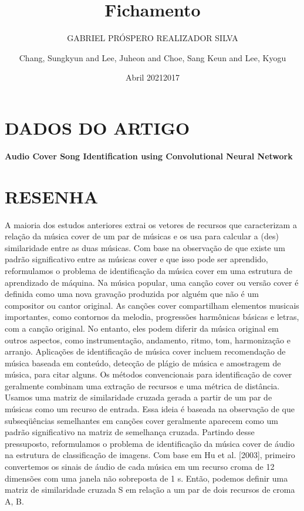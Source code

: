 \documentclass{article}
\title{Fichamento}
\author{GABRIEL PRÓSPERO REALIZADOR  SILVA}
\date{Abril 2021}
\begin{document}
\maketitle

\section{DADOS DO ARTIGO}
\textbf{ Audio Cover Song Identification using Convolutional Neural Network  \\}
\author{Chang, Sungkyun and Lee, Juheon and Choe, Sang Keun and Lee, Kyogu \\}
\date{2017}

\section{RESENHA}
A maioria dos estudos anteriores extrai os vetores de recursos que caracterizam a relação da música cover de um par de músicas e os usa para calcular a (des) similaridade entre as duas músicas. 
Com base na observação de que existe um padrão significativo entre as músicas cover e que isso pode ser aprendido, reformulamos o problema de identificação da música cover em uma estrutura de aprendizado de máquina.
Na música popular, uma canção cover ou versão cover é definida como uma nova gravação produzida por alguém que não é um compositor ou cantor original. 
As canções cover compartilham elementos musicais importantes, como contornos da melodia, progressões harmônicas básicas e letras, com a canção original. 
No entanto, eles podem diferir da música original em outros aspectos, como instrumentação, andamento, ritmo, tom, harmonização e arranjo. 
Aplicações de identificação de música cover incluem recomendação de música baseada em conteúdo, detecção de plágio de música e amostragem de música, para citar alguns. 
Os métodos convencionais para identificação de cover geralmente combinam uma extração de recursos e uma métrica de distância.
Usamos uma matriz de similaridade cruzada gerada a partir de um par de músicas como um recurso de entrada. 
Essa ideia é baseada na observação de que subseqüências semelhantes em canções cover geralmente aparecem como um padrão significativo na matriz de semelhança cruzada. 
Partindo desse pressuposto, reformulamos o problema de identificação da música cover de áudio na estrutura de classificação de imagens.
Com base em Hu et al. [2003], primeiro convertemos os sinais de áudio de cada música em um recurso croma de 12 dimensões com uma janela não sobreposta de 1 s. 
Então, podemos definir uma matriz de similaridade cruzada S em relação a um par de dois recursos de croma {A, B}.
\end{document}
